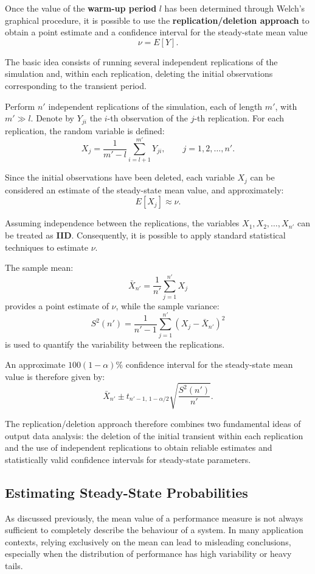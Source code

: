 Once the value of the \textbf{warm-up period} $l$ has been determined through Welch’s graphical
procedure, it is possible to use the \textbf{replication/deletion approach} to obtain
a point estimate and a confidence interval for the steady-state mean value
\[
\nu = E[Y].
\]

The basic idea consists of running several independent replications of the simulation and,
within each replication, deleting the initial observations corresponding to the
transient period.

Perform $n'$ independent replications of the simulation, each of length $m'$,
with $m' \gg l$. Denote by $Y_{ji}$ the $i$-th observation of the $j$-th replication.
For each replication, the random variable is defined:
\[
X_j = \frac{1}{m' - l} \sum_{i=l+1}^{m'} Y_{ji},
\qquad j = 1,2,\dots,n'.
\]

Since the initial observations have been deleted, each variable $X_j$ can be
considered an estimate of the steady-state mean value, and approximately:
\[
E[X_j] \approx \nu.
\]

Assuming independence between the replications, the variables $X_1, X_2, \dots, X_{n'}$ can
be treated as \textbf{IID}. Consequently, it is possible to apply standard statistical
techniques to estimate $\nu$.

The sample mean:
\[
\bar{X}_{n'} = \frac{1}{n'} \sum_{j=1}^{n'} X_j
\]
provides a point estimate of $\nu$, while the sample variance:
\[
S^2(n') = \frac{1}{n'-1} \sum_{j=1}^{n'} (X_j - \bar{X}_{n'})^2
\]
is used to quantify the variability between the replications.

An approximate $100(1-\alpha)\%$ confidence interval for the steady-state mean value
is therefore given by:
\[
\bar{X}_{n'} \pm t_{n'-1,\,1-\alpha/2} \sqrt{\frac{S^2(n')}{n'}}.
\]

The replication/deletion approach therefore combines two fundamental ideas of output data
analysis: the deletion of the initial transient within each replication and
the use of independent replications to obtain reliable estimates and statistically valid
confidence intervals for steady-state parameters.

\subsection{Estimating Steady-State Probabilities}

As discussed previously, the mean value of a performance measure is not
always sufficient to completely describe the behaviour of a system.
In many application contexts, relying exclusively on the mean can lead to
misleading conclusions, especially when the distribution of performance
has high variability or heavy tails.

